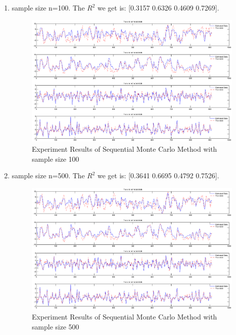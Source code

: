 \documentclass[12pt,letterpaper]{article}
\begin{document}
\begin{enumerate}
\item sample size n=100. The $R^2$ we get is: [0.3157  0.6326  0.4609  0.7269].

\begin{figure}
\begin{center}
\includegraphics[width=0.9\linewidth]{SMC100.eps}
\caption{Experiment Results of Sequential Monte Carlo Method with sample size 100}
\label{fig:database}
\end{center}
\end{figure}


\item sample size n=500. The $R^2$ we get is: [0.3641  0.6695  0.4792  0.7526].

\begin{figure}
\begin{center}
\includegraphics[width=0.9\linewidth]{SMC500.eps}
\caption{Experiment Results of Sequential Monte Carlo Method with sample size 500}
\label{fig:database}
\end{center}
\end{figure}

\end{enumerate}
\end{document}
